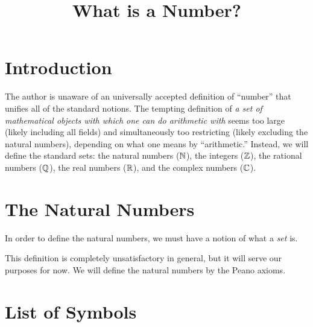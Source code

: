 \documentclass{article}
\title{What is a Number?}
\begin{document}
\maketitle

\section{Introduction}\label{sec:intro}
The author is unaware of an universally accepted definition of ``number'' that unifies all of the standard notions. The tempting definition of \textit{a set of mathematical objects with which one can do arithmetic with} seems too large (likely including all fields) and simultaneously too restricting (likely excluding the natural numbers), depending on what one means by ``arithmetic.'' Instead, we will define the standard sets: the natural numbers ($\mathbb{N}$), the integers ($\mathbb{Z}$), the rational numbers ($\mathbb{Q}$), the real numbers ($\mathbb{R}$), and the complex numbers ($\mathbb{C}$).


\section{The Natural Numbers}\label{sec:naturals}
In order to define the natural numbers, we must have a notion of what a \textit{set} is.


This definition is completely unsatisfactory in general, but it will serve our purposes for now. \cite{HalmosNST} We will define the natural numbers by the Peano axioms.





\section*{List of Symbols}
\PrintListOfSymbols

\printbibliography
\end{document}
